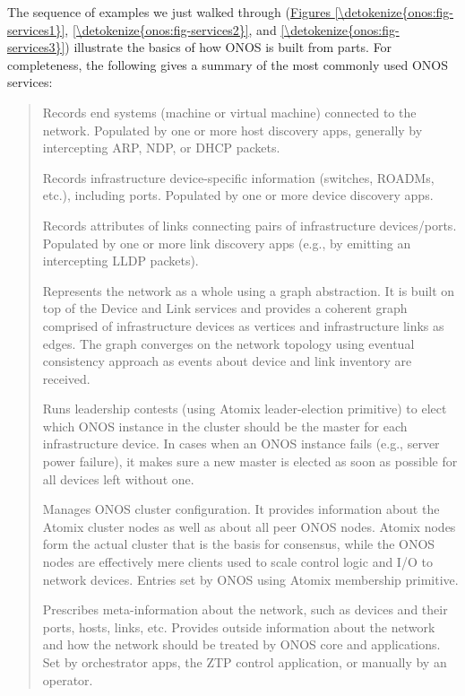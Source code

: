 \documentclass[letterpaper,11pt,english]{sphinxmanual}
\begin{document}
The sequence of examples we just walked through (\hyperref[\detokenize{onos:fig-services1}]{Figures \ref{\detokenize{onos:fig-services1}}}, \hyperref[\detokenize{onos:fig-services2}]{\ref{\detokenize{onos:fig-services2}}}, and \hyperref[\detokenize{onos:fig-services3}]{\ref{\detokenize{onos:fig-services3}}}) illustrate the basics of how ONOS is built from
parts. For completeness, the following gives a summary of the most
commonly used ONOS services:
\begin{quote}

 Records end systems (machine or virtual machine) connected
to the network. Populated by one or more host discovery apps,
generally by intercepting ARP, NDP, or DHCP packets.

 Records infrastructure device-specific information
(switches, ROADMs, etc.), including ports. Populated by one or more
device discovery apps.

 Records attributes of links connecting pairs of
infrastructure devices/ports. Populated by one or more link
discovery apps (e.g., by emitting an intercepting LLDP packets).

 Represents the network as a whole using a graph
abstraction. It is built on top of the Device and Link services and
provides a coherent graph comprised of infrastructure devices as
vertices and infrastructure links as edges. The graph converges on the
network topology using eventual consistency approach as events about
device and link inventory are received.

 Runs leadership contests (using Atomix leader-election
primitive) to elect which ONOS instance in the cluster should be the
master for each infrastructure device. In cases when an ONOS instance
fails (e.g., server power failure), it makes sure a new master is
elected as soon as possible for all devices left without one.

 Manages ONOS cluster configuration. It provides
information about the Atomix cluster nodes as well as about all peer
ONOS nodes. Atomix nodes form the actual cluster that is the basis
for consensus, while the ONOS nodes are effectively mere clients
used to scale control logic and I/O to network devices. Entries set
by ONOS using Atomix membership primitive.

 Prescribes meta-information about the network,
such as devices and their ports, hosts, links, etc. Provides outside
information about the network and how the network should be treated by
ONOS core and applications. Set by orchestrator apps, the ZTP control
application, or manually by an operator.


\end{quote}
\end{document}

